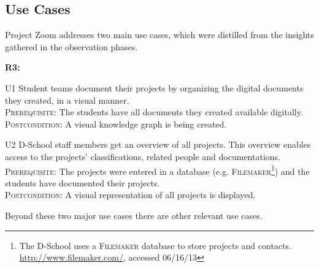 \subsection{Use Cases}
Project Zoom addresses two main use cases, which were distilled from the insights gathered in the observation phases.

\begin{labeling}{\textbf{R3:}}
\item[U1\label{uc:organize}] Student teams document their projects by organizing the digital documents they created, in a visual manner.\\
\textsc{Prerequisite}: The students have all documents they created available digitally.\\
\textsc{Postcondition}: A visual knowledge graph is being created.

\item[U2\label{uc:display}] D-School staff members get an overview of all projects. This overview enables access to the projects' classifications, related people and documentations.\\
\textsc{Prerequisite}: The projects were entered in a database (e.g. \textsc{Filemaker}\footnote{The D-School uses a \textsc{Filemaker} database to store projects and contacts. \url{http://www.filemaker.com/}, accessed 06/16/13}) and the students have documented their projects.\\
\textsc{Postcondition}: A visual representation of all projects is displayed.
\end{labeling}

Beyond these two major use cases there are other relevant use cases.

